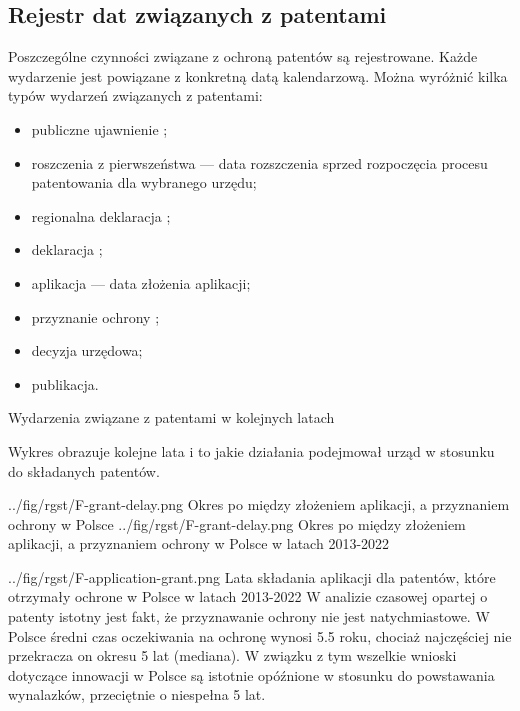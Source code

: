   \newpage\subsection
{Rejestr dat związanych z patentami}

Poszczególne czynności związane z ochroną patentów są rejestrowane.
Każde wydarzenie jest powiązane z konkretną datą kalendarzową.
Można wyróżnić kilka typów wydarzeń związanych z patentami:

  \begin{itemize}

\item
publiczne ujawnienie ;


\item
roszczenia z pierwszeństwa  --- 
data rozszczenia sprzed rozpoczęcia procesu patentowania dla wybranego urzędu;


\item
regionalna deklaracja ;


\item
deklaracja ;


\item
aplikacja  --- data złożenia aplikacji;


\item
przyznanie ochrony ;


\item
decyzja urzędowa;


\item
publikacja.
\end{itemize}



  \newpage
{}
{Wydarzenia związane z patentami w kolejnych latach}

Wykres obrazuje kolejne lata i to jakie
działania podejmował urząd w stosunku do składanych patentów.



  \newpage
\figsides
{../fig/rgst/F-grant-delay.png}
{Okres po między złożeniem aplikacji, a przyznaniem ochrony w Polsce}
{../fig/rgst/F-grant-delay.png}
{ Okres po między złożeniem aplikacji, a przyznaniem ochrony w Polsce 
  w latach 2013-2022 }

\figside
{../fig/rgst/F-application-grant.png}
{ Lata składania aplikacji dla patentów, które otrzymały ochrone w Polsce
  w latach 2013-2022 }
{ W analizie czasowej opartej o patenty istotny jest fakt, że przyznawanie ochrony
  nie jest natychmiastowe. W Polsce średni czas oczekiwania na ochronę wynosi
  5.5 roku, chociaż najczęściej nie przekracza on okresu 5 lat (mediana).
  W związku z tym wszelkie wnioski dotyczące innowacji w Polsce są istotnie
  opóźnione w stosunku do powstawania wynalazków, przeciętnie o niespełna 5 lat. }


